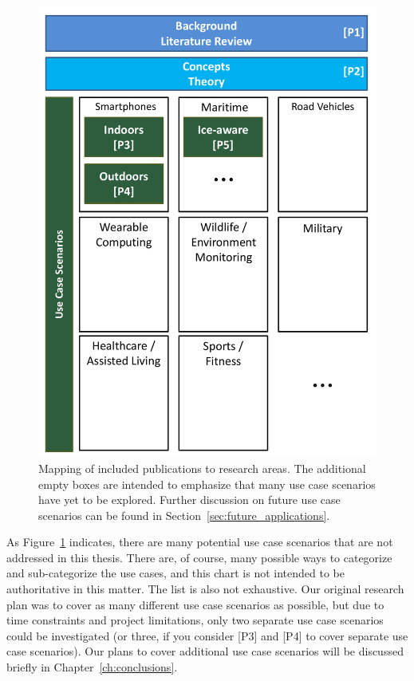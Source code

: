 \begin{figure}
  \begin{center}
    \includegraphics[width=1.0\textwidth]{Images/figChapter4}
  \end{center}
  \caption[Mapping of included publications to research areas]{Mapping of included publications to research areas. The additional empty boxes are intended to emphasize that many use case scenarios have yet to be explored. Further discussion on future use case scenarios can be found in Section~\ref{sec:future_applications}.}
  \label{fig:publication-chart}
\end{figure}

As Figure~\ref{fig:publication-chart} indicates, there are many potential use case scenarios that are not addressed in this thesis. There are, of course, many possible ways to categorize and sub-categorize the use cases, and this chart is not intended to be authoritative in this matter. The list is also not exhaustive. Our original research plan was to cover as many different use case scenarios as possible, but due to time constraints and project limitations, only two separate use case scenarios could be investigated (or three, if you consider [P3] and [P4] to cover separate use case scenarios). Our plans to cover additional use case scenarios will be discussed briefly in Chapter~\ref{ch:conclusions}.


